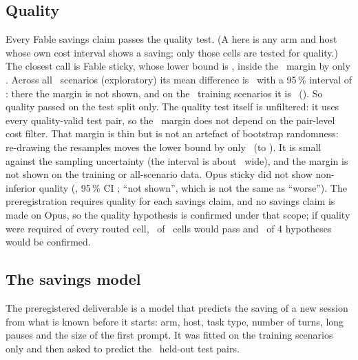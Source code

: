 \subsection{Quality}

\begin{table}[htbp]
\centering\small
\caption{Quality: mean difference in turn-pass fraction, arm minus plain host, test split, all quality-valid
pairs. Non-inferior when the lower end of the interval is above \NIMargin.}
\label{tab:quality}

\end{table}

Every Fable savings claim passes the quality test. (A  here is any arm and host whose
own cost interval shows a saving; only those cells are tested for quality.) The closest call is Fable sticky,
whose lower bound is \QFableStickyLow, inside the \NIMargin\ margin by only \QFableStickyMarginGap.
Across all \QAllScen\ scenarios (exploratory) its mean difference is \QAllFableSticky\ with a 95\,\%
interval of \QAllFableStickyCI: there the margin is not shown, and on the \NTrain\ training scenarios it is
\RvQTrainFableSticky\ (\RvQTrainFableStickyCI). So quality passed on the test split only. The quality test itself
is unfiltered: it uses every quality-valid test pair, so the \QFableStickyMarginGap\ margin does not depend on the
pair-level cost filter. That margin is thin but is not an artefact of bootstrap randomness: re-drawing the
resamples moves the lower bound by only \RvQNoise\ (to \RvQAltLow). It is small against the sampling uncertainty (the
interval is about \RvQWidth\ wide), and the margin is not shown on the training or all-scenario data. Opus sticky did not show
non-inferior quality (\QOpusSticky, 95\,\% CI \QOpusStickyCI; ``not shown'', which is not the same as ``worse'').
The preregistration requires quality for each savings claim, and no savings claim is made on Opus, so the quality
hypothesis is confirmed under that scope; if quality were required of every routed cell, \RvNQualCells\ of
\RvNRoutedCells\ cells would pass and \RvNHypAllQuality\ of 4 hypotheses would be confirmed.

\subsection{The savings model}\label{sec:modelcheck}

The preregistered deliverable is a model that predicts the saving of a new session from what is known before
it starts: arm, host, task type, number of turns, long pauses and the size of the first prompt. It was fitted
on the training scenarios only and then asked to predict the \MCPairs\ held-out test pairs.

